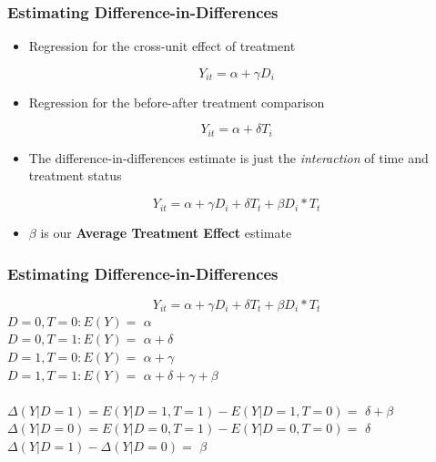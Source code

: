 \documentclass[xcolor=x11names,compress]{beamer}\usepackage[]{graphicx}\usepackage[]{color}
\renewcommand{\(}{\begin{columns}}
\renewcommand{\)}{\end{columns}}
\newcommand{\<}[1]{\begin{column}{#1}}
\renewcommand{\>}{\end{column}}
\begin{document}
\begin{frame}
\frametitle{Estimating Difference-in-Differences}
\begin{itemize}
\item Regression for the cross-unit effect of treatment
\end{itemize}
$$ Y_{it} = \alpha + \gamma D_i$$
\pause
\begin{itemize}
\item Regression for the before-after treatment comparison
\end{itemize}
$$ Y_{it} = \alpha + \delta T_i$$
\pause
\begin{itemize}
\item The difference-in-differences estimate is just the \textit{interaction} of time and treatment status
\end{itemize}
$$ Y_{it} = \alpha + \gamma D_i + \delta T_t + \beta D_i * T_t $$
\begin{itemize}
\pause
\item $\beta$ is our \textbf{Average Treatment Effect} estimate
\end{itemize}
\end{frame}

\begin{frame}
\frametitle{Estimating Difference-in-Differences}
$$ Y_{it} = \alpha + \gamma D_i + \delta T_t + \beta D_i * T_t $$
\pause
\vspace*{10px}
$D=0, T=0: E(Y)=$ \pause $\alpha$ \\
\pause
$D=0, T=1: E(Y)=$ \pause $\alpha + \delta$ \\
\pause
$D=1, T=0: E(Y)=$ \pause $\alpha + \gamma$ \\
\pause
$D=1, T=1: E(Y)=$ \pause $\alpha + \delta + \gamma + \beta$ \\ \\
\vspace*{20px}
\pause
$\Delta(Y|D=1) = E(Y|D=1, T=1) - E(Y|D=1, T=0) =$ \pause $ \delta + \beta$ \\
\pause
$\Delta(Y|D=0) = E(Y|D=0, T=1) - E(Y|D=0, T=0) =$ \pause $ \delta$ \\
\pause
\vspace*{20px}
$\Delta(Y|D=1) - \Delta(Y|D=0) =$ \pause $\beta$
\end{frame}
\end{document}

